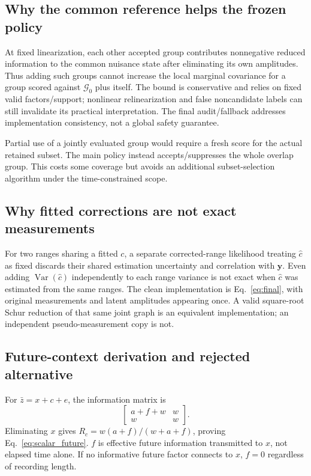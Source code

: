 \documentclass[conference]{IEEEtran}
\newcommand{\Var}{\operatorname{Var}}
\begin{document}
\subsection{Why the common reference helps the frozen policy}
At fixed linearization, each other accepted group contributes nonnegative reduced information to the common nuisance state after eliminating its own amplitudes. Thus adding such groups cannot increase the local marginal covariance for a group scored against $\mathcal G_0$ plus itself. The bound is conservative and relies on fixed valid factors/support; nonlinear relinearization and false noncandidate labels can still invalidate its practical interpretation. The final audit/fallback addresses implementation consistency, not a global safety guarantee.

Partial use of a jointly evaluated group would require a fresh score for the actual retained subset. The main policy instead accepts/suppresses the whole overlap group. This costs some coverage but avoids an additional subset-selection algorithm under the time-constrained scope.

\subsection{Why fitted corrections are not exact measurements}
For two ranges sharing a fitted $c$, a separate corrected-range likelihood treating $\hat c$ as fixed discards their shared estimation uncertainty and correlation with $\mathbf y$. Even adding $\Var(\hat c)$ independently to each range variance is not exact when $\hat c$ was estimated from the same ranges. The clean implementation is Eq.~\eqref{eq:final}, with original measurements and latent amplitudes appearing once. A valid square-root Schur reduction of that same joint graph is an equivalent implementation; an independent pseudo-measurement copy is not.

\subsection{Future-context derivation and rejected alternative}
For $\bar z=x+c+e$, the information matrix is
\begin{equation}
 \begin{bmatrix}a+f+w&w\\w&w\end{bmatrix}.
\end{equation}
Eliminating $x$ gives $R_c=w(a+f)/(w+a+f)$, proving Eq.~\eqref{eq:scalar_future}. $f$ is effective future information transmitted to $x$, not elapsed time alone. If no informative future factor connects to $x$, $f=0$ regardless of recording length.
\end{document}

